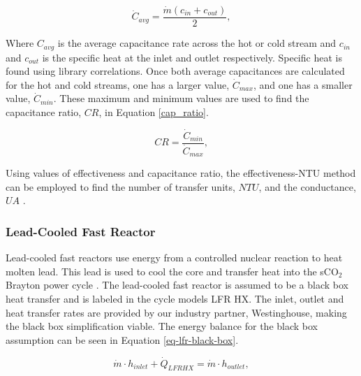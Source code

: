 \begin{paracol}{2}
\begin{equation}
    \label{avg_cap}
    \dot{C}_{avg} = \frac{\dot{m}(c_{in}+c_{out})}{2},
\end{equation}

Where $C_{avg}$ is the average capacitance rate across the hot or cold stream and $c_{in}$ and $c_{out}$ is the specific heat at the inlet and outlet respectively. Specific heat is found using library correlations. Once both average capacitances are calculated for the hot and cold streams, one has a larger value, $\dot{C}_{max}$, and one has a smaller value,  $\dot{C}_{min}$. These maximum and minimum values are used to find the capacitance ratio, $CR$, in Equation \ref{cap_ratio}.

\begin{equation}
    \label{cap_ratio}
    CR = \frac{\dot{C}_{min}}{\dot{C}_{max}},
\end{equation}

Using values of effectiveness and capacitance ratio, the effectiveness-NTU method can be employed to find the number of transfer units, $NTU$, and the conductance, $UA$ \cite{klein_nellis_2011,nellis_klein_2008}. 



\subsubsection{Lead-Cooled Fast Reactor}
Lead-cooled fast reactors use energy from a controlled nuclear reaction to heat molten lead. This lead is used to cool the core and transfer heat into the sCO$_2$ Brayton power cycle \cite{smith_2016_lfr_background,alemberti_2013_lfr_overview}. The lead-cooled fast reactor is assumed to be a black box heat transfer and is labeled in the cycle models LFR HX. The inlet, outlet and heat transfer rates are provided by our industry partner, Westinghouse, making the black box simplification viable. The energy balance for the black box assumption can be seen in Equation \ref{eq-lfr-black-box}.

\begin{equation}
    \label{eq-lfr-black-box}
    \dot{m} \cdot h_{inlet} + \dot{Q}_{LFRHX} = \dot{m} \cdot h_{outlet},
\end{equation}



\end{paracol}
